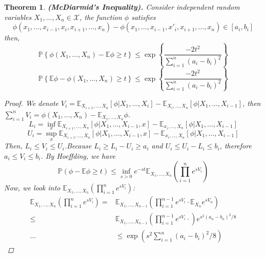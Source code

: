 \documentclass[a4paper]{article}
\newtheorem{theorem}{Theorem}
\begin{document}
\begin{theorem}
    \textbf{(McDiarmid's Inequality).}
    Consider independent random variables $ X_1, \ldots, X_n \in \mathcal{X} $, the function $ \phi $ satisfies
    \[
        \phi(x_1, \ldots, x_{i-1}, x_i, x_{i+1}, \ldots, x_n) - \phi(x_1, \ldots, x_{i-1}, {x'}_i, x_{i+1}, \ldots, x_n) \in [a_i, b_i]
    \]
    then,
    \begin{equation}
        \mathbb{P}\left\{ \phi(X_1, \ldots, X_n) - \mathbb{E} \phi \ge t \right\} \le \exp\left\{ \frac{-2t^2}{\sum^{n}_{i=1} {(a_i - b_i)}^2}  \right\}
    \end{equation}
    \begin{equation}
        \mathbb{P}\left\{ \mathbb{E}\phi - \phi(X_1, \ldots, X_n) \ge t \right\} \le \exp\left\{ \frac{-2t^2}{\sum^{n}_{i=1} {(a_i - b_i)}^2}  \right\}
    \end{equation}
    \begin{proof}
        We denote $ V_i = \mathbb{E}_{X_{i+1}, \ldots, X_n}[\phi | X_1, \ldots, X_i] - \mathbb{E}_{X_i, \ldots, X_n}[\phi | X_1, \ldots, X_{i-1}] $, then
        $ \sum^{n}_{i=1} V_i = \phi(X_1, \ldots, X_n) - \mathbb{E}_{X_1, \ldots, X_n}\phi $.\\
        \[
            L_i = \inf_x \mathbb{E}_{X_{i+1}, \ldots, X_n} [\phi | X_1, \ldots, X_{i-1}, x] - \mathbb{E}_{x_i, \ldots, X_n}[\phi | X_1, \ldots, X_{i-1}]
        \]
        \[
            U_i = \sup_x \mathbb{E}_{X_{i+1}, \ldots, X_n} [\phi | X_1, \ldots, X_{i-1}, x] - \mathbb{E}_{x_i, \ldots, X_n}[\phi | X_1, \ldots, X_{i-1}]
        \]
        Then, $ L_i \le V_i \le U_i $.Because $ L_i \ge L_i - U_i \ge a_i $ and $ U_i \le U_i - L_i \le b_i $,
        therefore $ a_i \le V_i \le b_i $.
        By Hoeffding, we have
        \[
            \mathbb{P}(\phi - \mathbb{E}\phi \ge t) \le \inf_{s > 0} e^{-st} \mathbb{E}_{X_1, \ldots, X_n} \left( \prod^{n}_{i=1} e^{sV_i} \right)
        \]
        Now, we look into $ \mathbb{E}_{X_1, \ldots, X_n} \left( \prod^{n}_{i=1} e^{sV_i} \right)$:
        \begin{align*}
            \mathbb{E}_{X_1, \ldots, X_n} \left( \prod^{n}_{i=1} e^{sV_i} \right)
            =& \mathbb{E}_{X_1, \ldots, X_{n-1}} \left( \prod^{n-1}_{i=1} e^{sV_i} \cdot \mathbb{E}_{X_n} e^{sV_n}\right)\\
            \le& \mathbb{E}_{X_1, \ldots, X_{n-1}} \left( \prod^{n-1}_{i=1} e^{sV_i} \cdot \right) e^{s^2 {(a_n - b_n)}^2 / 8}\\
            \ldots& \le \exp \left( s^2 \sum^{n}_{i=1} {(a_i - b_i)}^2/8 \right)
        \end{align*}
    \end{proof}
\end{theorem}
\end{document}
